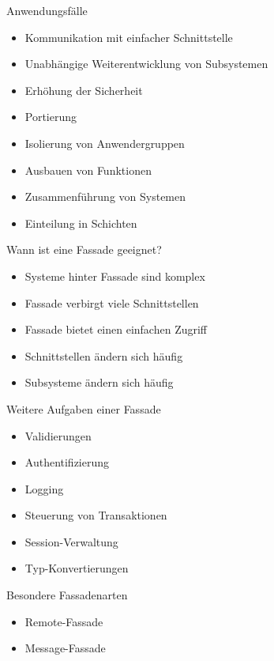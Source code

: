 \begin{frame}{Anwendungsfälle}
	\begin{itemize}
 		\item Kommunikation mit einfacher Schnittstelle
 		\item Unabhängige Weiterentwicklung von Subsystemen
 		\item Erhöhung der Sicherheit
 		\item Portierung
 		\item Isolierung von Anwendergruppen
 		\item Ausbauen von Funktionen
		\item Zusammenführung von Systemen
		\item Einteilung in Schichten
 	\end{itemize}
\end{frame}
 
\begin{frame}{Wann ist eine Fassade geeignet?}
	\begin{itemize}
 		\item Systeme hinter Fassade sind komplex
 		\item Fassade verbirgt viele Schnittstellen
 		\item Fassade bietet einen einfachen Zugriff
 		\item Schnittstellen ändern sich häufig
 		\item Subsysteme ändern sich häufig
 	\end{itemize}
\end{frame}

\begin{frame}{Weitere Aufgaben einer Fassade}
	\begin{itemize}
 		\item Validierungen
 		\item Authentifizierung
 		\item Logging
 		\item Steuerung von Transaktionen
 		\item Session-Verwaltung
 		\item Typ-Konvertierungen
 	\end{itemize}
\end{frame}

\begin{frame}{Besondere Fassadenarten}
	\begin{itemize}
 		\item Remote-Fassade
 		\item Message-Fassade
 	\end{itemize}
\end{frame}

